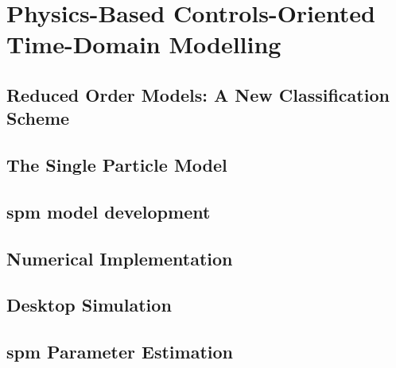 


\chapter{Physics-Based Controls-Oriented Time-Domain Modelling}

\graphicspath{{4/figures/}}

\section{Reduced Order Models: A New Classification Scheme}\label{sec:classificationscheme}


\section{The Single Particle Model}


\section{\Gls{spm} model development}\label{sec:spmmodeldevelopment}


\section{Numerical Implementation}\label{sec:numericalimplementation}


\section{Desktop Simulation}\label{sec:basicspmsimresults}


\section{\Gls{spm} Parameter Estimation}\label{sec:spmparameterestim}
